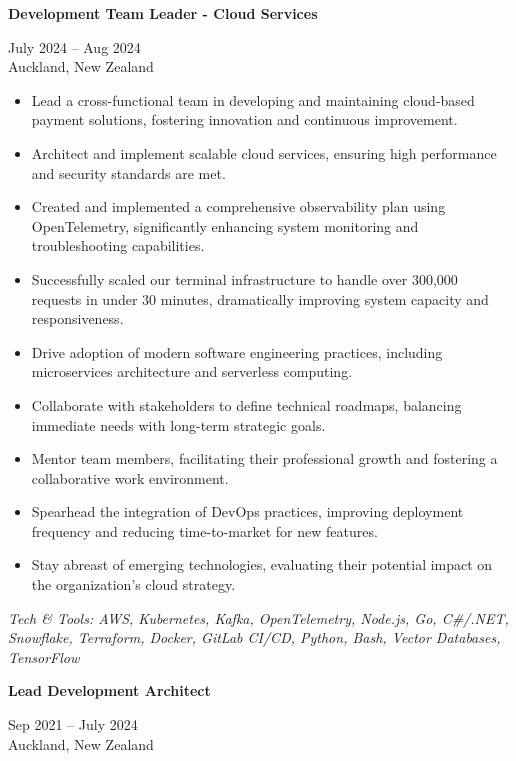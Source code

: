 \documentclass[10pt,a4paper,ragged2e,withhyper]{altacv}
\renewcommand{\cvevent}[4]{%
  \textbf{#1} %
  \hfill %
  \begin{minipage}[t]{.5\linewidth}
    \raggedleft %
    \small#3 %
    \\ %
    #4 %
  \end{minipage}
  \vspace{\baselineskip} %
}
\begin{document}
\cvevent{Development Team Leader - Cloud Services}{Invenco by GVR}{July 2024 -- Aug 2024}{Auckland, New Zealand}

\begin{itemize}
\item Lead a cross-functional team in developing and maintaining cloud-based payment solutions, fostering innovation and continuous improvement.
\item Architect and implement scalable cloud services, ensuring high performance and security standards are met.
\item Created and implemented a comprehensive observability plan using OpenTelemetry, significantly enhancing system monitoring and troubleshooting capabilities.
\item Successfully scaled our terminal infrastructure to handle over 300,000 requests in under 30 minutes, dramatically improving system capacity and responsiveness.
\item Drive adoption of modern software engineering practices, including microservices architecture and serverless computing.
\item Collaborate with stakeholders to define technical roadmaps, balancing immediate needs with long-term strategic goals.
\item Mentor team members, facilitating their professional growth and fostering a collaborative work environment.
\item Spearhead the integration of DevOps practices, improving deployment frequency and reducing time-to-market for new features.
\item Stay abreast of emerging technologies, evaluating their potential impact on the organization's cloud strategy.
\end{itemize}

\vspace{0.5cm}

\textit{Tech \& Tools: AWS, Kubernetes, Kafka, OpenTelemetry, Node.js, Go, C\#/.NET, Snowflake, Terraform, Docker, GitLab CI/CD, Python, Bash, Vector Databases, TensorFlow}

\divider


\cvevent{Lead Development Architect}{Idexx Laboratories}{Sep 2021 -- July 2024}{Auckland, New Zealand}
\end{document}
